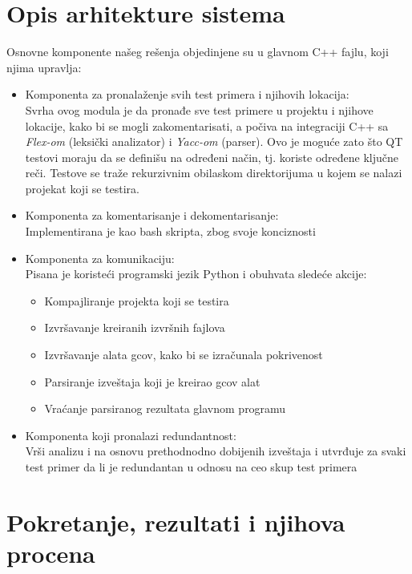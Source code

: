 \documentclass[a4paper]{article}
\begin{document}
\section{Opis arhitekture sistema}
\label{sec:arhitektura}

Osnovne komponente našeg rešenja objedinjene su u glavnom C++ fajlu, koji njima upravlja:
\begin{itemize}
    \item Komponenta za pronalaženje svih test primera i njihovih lokacija:\\
            Svrha ovog modula je da pronađe sve test primere u projektu i njihove lokacije, kako bi se mogli zakomentarisati, a počiva na integraciji C++ sa \textit{Flex-om} (leksički analizator) i \textit{Yacc-om} (parser). Ovo je moguće zato što QT testovi moraju da se definišu na određeni način, tj. koriste određene ključne reči. Testove se traže rekurzivnim obilaskom direktorijuma u kojem se nalazi projekat koji se testira.
    \item Komponenta za komentarisanje i dekomentarisanje:\\
            Implementirana je kao bash skripta, zbog svoje konciznosti
    \item Komponenta za komunikaciju:\\
            Pisana je koristeći programski jezik Python i obuhvata sledeće akcije:
            \begin{itemize}
                \item Kompajliranje projekta koji se testira
                \item Izvršavanje kreiranih izvršnih fajlova
                \item Izvršavanje alata gcov, kako bi se izračunala pokrivenost
                \item Parsiranje izveštaja koji je kreirao gcov alat
                \item Vraćanje parsiranog rezultata glavnom programu
            \end{itemize}
    \item Komponenta koji pronalazi redundantnost:\\
            Vrši analizu i na osnovu prethodnodno dobijenih izveštaja i utvrđuje za svaki test primer da li je redundantan u odnosu na ceo skup test primera
\end{itemize}

\section{Pokretanje, rezultati i njihova procena}
\label{sec:pokretanje_rezultati_procena}
\end{document}
